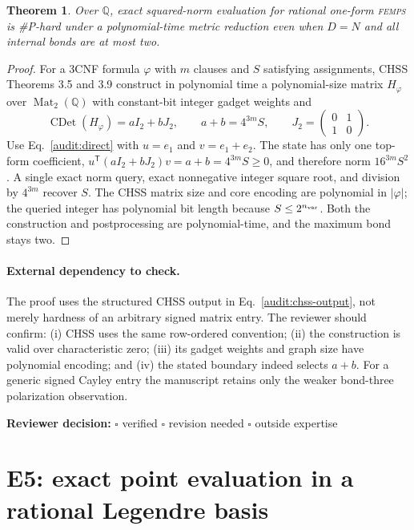 \documentclass[11pt]{article}
\newtheorem{theorem}{Theorem}[section]
\theoremstyle{definition}
\newcommand{\Mat}{\operatorname{Mat}}
\newcommand{\CDet}{\operatorname{CDet}}
\newcommand{\FEMPS}{\textnormal{\textsc{femps}}}
\newcommand{\reviewline}{\par\smallskip\noindent
  \textbf{Reviewer decision:} $\square$ verified \quad $\square$ revision
  needed \quad $\square$ outside expertise\par\medskip}
\begin{document}
\begin{theorem}
Over $\mathbb Q$, exact squared-norm evaluation for rational one-form
\FEMPS{} is \#P-hard under a polynomial-time metric reduction even when
$D=N$ and all internal bonds are at most two.
\end{theorem}

\begin{proof}
For a 3CNF formula $\varphi$ with $m$ clauses and $S$ satisfying assignments,
CHSS Theorems 3.5 and 3.9 construct in polynomial time a polynomial-size
matrix $H_\varphi$ over $\Mat_2(\mathbb Q)$ with constant-bit integer gadget
weights and
\begin{equation}
\CDet(H_\varphi)=aI_2+bJ_2,
\qquad a+b=4^{3m}S,
\qquad J_2=\begin{pmatrix}0&1\\1&0\end{pmatrix}.
\label{audit:chss-output}
\end{equation}
Use Eq.~\eqref{audit:direct} with $u=e_1$ and $v=e_1+e_2$.  The state has only
one top-form coefficient,
$u^{\mathsf T}(aI_2+bJ_2)v=a+b=4^{3m}S\ge0$, and therefore norm
$16^{3m}S^2$.  A single exact norm query, exact nonnegative integer square
root, and division by $4^{3m}$ recover $S$.  The CHSS matrix size and core
encoding are polynomial in $|\varphi|$; the queried integer has polynomial bit
length because $S\le2^{n_{\rm var}}$.  Both the construction and
postprocessing are polynomial-time, and the maximum bond stays two.
\end{proof}

\paragraph{External dependency to check.}
The proof uses the structured CHSS output in Eq.~\eqref{audit:chss-output}, not
merely hardness of an arbitrary signed matrix entry.  The reviewer should
confirm: (i) CHSS uses the same row-ordered convention; (ii) the construction
is valid over characteristic zero; (iii) its gadget weights and graph size
have polynomial encoding; and (iv) the stated boundary indeed selects $a+b$.
For a generic signed Cayley entry the manuscript retains only the weaker
bond-three polarization observation.

\reviewline

\section{E5: exact point evaluation in a rational Legendre basis}
\end{document}
